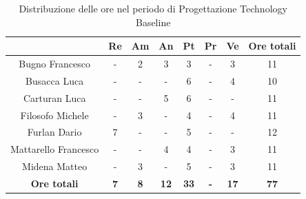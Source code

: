 \begin{table}[H]
  \centering
  \renewcommand{\arraystretch}{1.8}
  \begin{tabular}{c|c|c|c|c|c|c|c}
    \rowcolor[HTML]{125E28}
    \multicolumn{1}{c}{\color[HTML]{FFFFFF}\textbf{ Nominativo }}
                         & \multicolumn{1}{c}{\color[HTML]{FFFFFF}\textbf{ Re }}
                         & \multicolumn{1}{c}{\color[HTML]{FFFFFF}\textbf{ Am}}
                         & \multicolumn{1}{c}{\color[HTML]{FFFFFF}\textbf{ An }}
                         & \multicolumn{1}{c}{\color[HTML]{FFFFFF}\textbf{ Pt }}
                         & \multicolumn{1}{c}{\color[HTML]{FFFFFF}\textbf{ Pr }}
                         & \multicolumn{1}{c}{\color[HTML]{FFFFFF}\textbf{ Ve }}
                         & \multicolumn{1}{c}{\color[HTML]{FFFFFF}\textbf{ Ore totali }}                                                                                   \\
    \hline
    Bugno Francesco      & -                                                             & 2          & 3           & 3           & -          & 3           & 11          \\
    Busacca Luca         & -                                                             & -          & -           & 6           & -          & 4           & 10          \\
    Carturan Luca        & -                                                             & -          & 5           & 6           & -          & -           & 11          \\
    Filosofo Michele     & -                                                             & 3          & -           & 4           & -          & 4           & 11          \\
    Furlan Dario         & 7                                                             & -          & -           & 5           & -          & -           & 12          \\
    Mattarello Francesco & -                                                             & -          & 4           & 4           & -          & 3           & 11          \\
    Midena Matteo        & -                                                             & 3          & -           & 5           & -          & 3           & 11          \\
    \textbf{Ore totali}  & \textbf{7}                                                    & \textbf{8} & \textbf{12} & \textbf{33} & \textbf{-} & \textbf{17} & \textbf{77}
  \end{tabular}
  \caption{Distribuzione delle ore nel periodo di Progettazione Technology Baseline}
\end{table}


